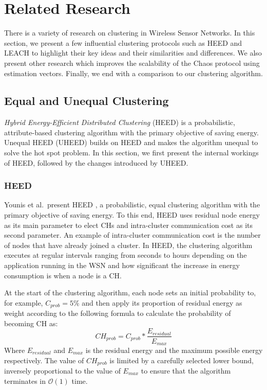 \chapter{Related Research}
\label{chap:related-research}
There is a variety of research on clustering in Wireless Sensor Networks. In this section, we present a few influential clustering protocols such as HEED and LEACH to highlight their key ideas and their similarities and differences. We also present other research which improves the scalability of the Chaos protocol using estimation vectors. Finally, we end with a comparison to our clustering algorithm.

\section{Equal and Unequal Clustering}
\textit{Hybrid Energy-Efficient Distributed Clustering} (HEED) \cite{Younis2004-HEED} is a probabilistic, attribute-based clustering algorithm with the primary objective of saving energy. Unequal HEED (UHEED) \cite{Ever2012-UHEED} builds on HEED and makes the algorithm unequal to solve the hot spot problem. In this section, we first present the internal workings of HEED, followed by the changes introduced by UHEED.

\subsection{HEED}
Younis et al.~present HEED \cite{Younis2004-HEED}, a probabilistic, equal clustering algorithm with the primary objective of saving energy. To this end, HEED uses residual node energy as its main parameter to elect CHs and intra-cluster communication cost as its second parameter. An example of intra-cluster communication cost is the number of nodes that have already joined a cluster. In HEED, the clustering algorithm executes at regular intervals ranging from seconds to hours depending on the application running in the WSN and how significant the increase in energy consumption is when a node is a CH.

At the start of the clustering algorithm, each node sets an initial probability to, for example, $C_{prob} = 5\%$ and then apply its proportion of residual energy as weight according to the following formula to calculate the probability of becoming CH as: $$CH_{prob} = C_{prob} * \frac{E_{residual}}{E_{max}}$$ Where $E_{residual}$ and $E_{max}$ is the residual energy and the maximum possible energy respectively. The value of $CH_{prob}$ is limited by a carefully selected lower bound, inversely proportional to the value of $E_{max}$ to ensure that the algorithm terminates in $\mathcal{O}(1)$ time.

